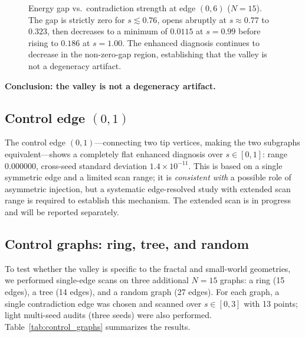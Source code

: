 \documentclass[aps,prb,reprint,superscriptaddress]{revtex4-2}
\begin{document}
\begin{figure}[t]
\centering
{}
\caption{Energy gap vs.\ contradiction strength at edge $(0,6)$ ($N=15$). The gap is strictly zero for $s\lesssim0.76$, opens abruptly at $s\approx0.77$ to $0.323$, then decreases to a minimum of $0.0115$ at $s=0.99$ before rising to $0.186$ at $s=1.00$. The enhanced diagnosis continues to decrease in the non-zero-gap region, establishing that the valley is not a degeneracy artifact.}
\label{fig:gap}
\end{figure}

\textbf{Conclusion: the valley is not a degeneracy artifact.}

\subsection{Control edge $(0,1)$}

The control edge $(0,1)$---connecting two tip vertices, making the two subgraphs equivalent---shows a completely flat enhanced diagnosis over $s\in[0,1]$: range $0.000000$, cross-seed standard deviation $1.4\times10^{-11}$. This is based on a single symmetric edge and a limited scan range; it is \emph{consistent with} a possible role of asymmetric injection, but a systematic edge-resolved study with extended scan range is required to establish this mechanism. The extended scan is in progress and will be reported separately.

\subsection{Control graphs: ring, tree, and random}

To test whether the valley is specific to the fractal and small-world geometries, we performed single-edge scans on three additional $N=15$ graphs: a ring (15 edges), a tree (14 edges), and a random graph (27 edges). For each graph, a single contradiction edge was chosen and scanned over $s\in[0,3]$ with 13 points; light multi-seed audits (three seeds) were also performed. Table~\ref{tab:control_graphs} summarizes the results.
\end{document}
